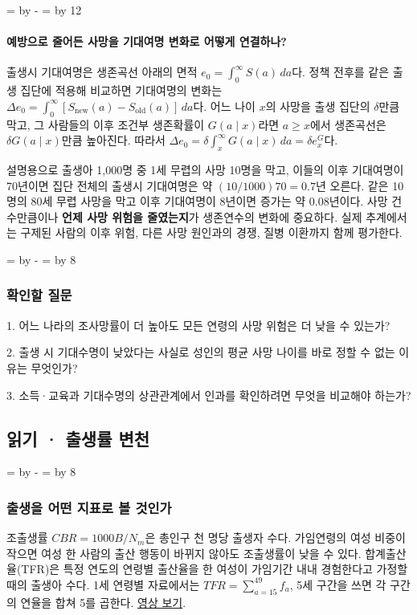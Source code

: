 \documentclass[10pt,a4paper]{article}
\newcommand{\ReserveQuestionSpace}{%
  \par\begingroup
  \dimen0=\pagegoal \advance\dimen0 by -\pagetotal
  \dimen2=\baselineskip \multiply\dimen2 by 12
  \ifdim\dimen0<\dimen2 \newpage\fi
  \endgroup}
\newcommand{\ReserveReadingSectionSpace}{%
  \par\begingroup
  \dimen0=\pagegoal \advance\dimen0 by -\pagetotal
  \dimen2=\baselineskip \multiply\dimen2 by 8
  \ifdim\dimen0<\dimen2 \newpage\fi
  \endgroup}
\begin{document}
\ReserveQuestionSpace
\paragraph{예방으로 줄어든 사망을 기대여명 변화로 어떻게 연결하나?}
출생시 기대여명은 생존곡선 아래의 면적 $e_0=\int_0^\infty S(a)\,da$다. 정책 전후를 같은 출생 집단에 적용해 비교하면 기대여명의 변화는 $\Delta e_0=\int_0^\infty[S_{\mathrm{new}}(a)-S_{\mathrm{old}}(a)]\,da$다. 어느 나이 $x$의 사망을 출생 집단의 $\delta$만큼 막고, 그 사람들의 이후 조건부 생존확률이 $G(a\mid x)$라면 $a\geq x$에서 생존곡선은 $\delta G(a\mid x)$만큼 높아진다. 따라서 $\Delta e_0=\delta\int_x^\infty G(a\mid x)\,da=\delta e_x^G$다.\par

설명용으로 출생아 1,000명 중 1세 무렵의 사망 10명을 막고, 이들의 이후 기대여명이 70년이면 집단 전체의 출생시 기대여명은 약 $(10/1000)70=0.7$년 오른다. 같은 10명의 80세 무렵 사망을 막고 이후 기대여명이 8년이면 증가는 약 0.08년이다. 사망 건수만큼이나 \textbf{언제 사망 위험을 줄였는지}가 생존연수의 변화에 중요하다. 실제 추계에서는 구제된 사람의 이후 위험, 다른 사망 원인과의 경쟁, 질병 이환까지 함께 평가한다.\par

\ReserveReadingSectionSpace
\subsubsection*{확인할 질문}

1. 어느 나라의 조사망률이 더 높아도 모든 연령의 사망 위험은 더 낮을 수 있는가?\par
2. 출생 시 기대수명이 낮았다는 사실로 성인의 평균 사망 나이를 바로 정할 수 없는 이유는 무엇인가?\par
3. 소득·교육과 기대수명의 상관관계에서 인과를 확인하려면 무엇을 비교해야 하는가?\par


\clearpage{}
{}
\subsection*{읽기 · 출생률 변천}
\ReserveReadingSectionSpace
\subsubsection*{출생을 어떤 지표로 볼 것인가}

조출생률 $CBR=1000B/N_m$은 총인구 천 명당 출생자 수다. 가임연령의 여성 비중이 작으면 여성 한 사람의 출산 행동이 바뀌지 않아도 조출생률이 낮을 수 있다. 합계출산율(TFR)은 특정 연도의 연령별 출산율을 한 여성이 가임기간 내내 경험한다고 가정할 때의 출생아 수다. 1세 연령별 자료에서는 $TFR=\sum_{a=15}^{49} f_a$, 5세 구간을 쓰면 각 구간의 연율을 합쳐 5를 곱한다. \href{https://youtu.be/d1JINF3af34}{영상 보기}.\par
\end{document}

